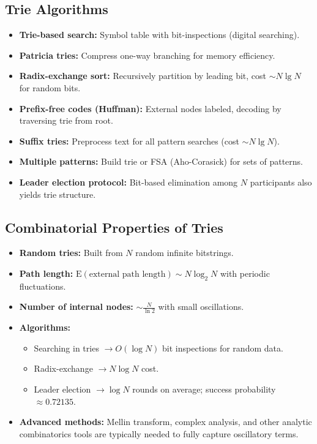 \documentclass[11pt,letterpaper]{article}
\begin{document}
\subsection{Trie Algorithms}
\begin{itemize}
  \item \textbf{Trie-based search:} Symbol table with bit-inspections (digital searching).
  \item \textbf{Patricia tries:} Compress one-way branching for memory efficiency.
  \item \textbf{Radix-exchange sort:} Recursively partition by leading bit, cost $\sim N\lg N$ for random bits.
  \item \textbf{Prefix-free codes (Huffman):} External nodes labeled, decoding by traversing trie from root.
  \item \textbf{Suffix tries:} Preprocess text for all pattern searches (cost $\sim N\lg N$).
  \item \textbf{Multiple patterns:} Build trie or FSA (Aho-Corasick) for sets of patterns.
  \item \textbf{Leader election protocol:} Bit-based elimination among $N$ participants also yields trie structure.
\end{itemize}

\subsection{Combinatorial Properties of Tries}
\begin{itemize}
  \item \textbf{Random tries:} Built from $N$ random infinite bitstrings.
  \item \textbf{Path length:} $\mathrm{E}(\text{external path length}) \sim N\log_2 N$ with periodic fluctuations.
  \item \textbf{Number of internal nodes:} $\sim \frac{N}{\ln 2}$ with small oscillations.
  \item \textbf{Algorithms:} 
    \begin{itemize}
      \item Searching in tries $\to O(\log N)$ bit inspections for random data.
      \item Radix-exchange $\to N\log N$ cost.
      \item Leader election $\to \log N$ rounds on average; success probability $\approx 0.72135$.
    \end{itemize}
  \item \textbf{Advanced methods:} Mellin transform, complex analysis, and other analytic combinatorics tools are typically needed to fully capture oscillatory terms.
\end{itemize}
\end{document}
